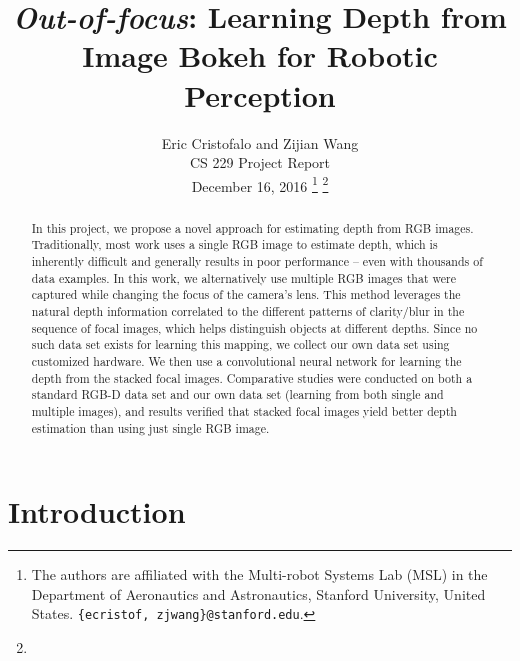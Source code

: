 \documentclass[letterpaper, 10 pt, conference]{ieeeconf}  %
\title{\LARGE \bf \textit{Out-of-focus}: Learning Depth from Image Bokeh for Robotic Perception}
\author{Eric Cristofalo and Zijian Wang\\
	CS 229 Project Report \\
	December 16, 2016
%
\thanks{The authors are affiliated with the Multi-robot Systems Lab (MSL) in the Department of Aeronautics and Astronautics, Stanford University, United States.
    \texttt{\small \{ecristof, zjwang\}@stanford.edu}.}
%
\thanks{}}
\begin{document}
\maketitle

\thispagestyle{plain} %
\pagestyle{plain}


\begin{abstract}
In this project, we propose a novel approach for estimating depth from RGB images. Traditionally, most work uses a single RGB image to estimate depth, which is inherently difficult and generally results in poor performance -- even with thousands of data examples. In this work, we alternatively use multiple RGB images that were captured while changing the focus of the camera's lens. This method leverages the natural depth information correlated to the different patterns of clarity/blur in the sequence of focal images, which helps distinguish objects at different depths. Since no such data set exists for learning this mapping, we collect our own data set using customized hardware. We then use a convolutional neural network for learning the depth from the stacked focal images. Comparative studies were conducted on both a standard RGB-D data set and our own data set (learning from both single and multiple images), and results verified that stacked focal images yield better depth estimation than using just single RGB image.
\end{abstract}


\section{Introduction}
\label{sec:introduction}
\end{document}
